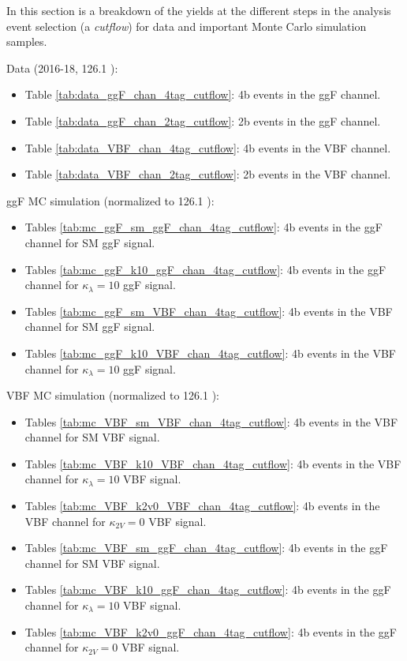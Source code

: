 \label{cutflows-tables}

In this section is a breakdown of the yields at the different steps in the analysis event selection (a \textit{cutflow}) for data and important Monte Carlo simulation samples.

Data (2016-18, 126.1 \ifb):

\begin{itemize}
	\item Table \ref{tab:data_ggF_chan_4tag_cutflow}: 4b events in the ggF channel.
	\item Table \ref{tab:data_ggF_chan_2tag_cutflow}: 2b events in the ggF channel.
	\item Table \ref{tab:data_VBF_chan_4tag_cutflow}: 4b events in the VBF channel.
	\item Table \ref{tab:data_VBF_chan_2tag_cutflow}: 2b events in the VBF channel.
\end{itemize}

ggF \HH MC simulation (normalized to 126.1 \ifb):
\begin{itemize}
	\item Tables \ref{tab:mc_ggF_sm_ggF_chan_4tag_cutflow}: 4b events in the ggF channel for SM ggF \HH signal.
	\item Tables \ref{tab:mc_ggF_k10_ggF_chan_4tag_cutflow}: 4b events in the ggF channel for $\kappa_{\lambda} = 10$ ggF \HH signal.
	\item Tables \ref{tab:mc_ggF_sm_VBF_chan_4tag_cutflow}: 4b events in the VBF channel for SM ggF \HH signal.
	\item Tables \ref{tab:mc_ggF_k10_VBF_chan_4tag_cutflow}: 4b events in the VBF channel for $\kappa_{\lambda} = 10$ ggF \HH signal.
\end{itemize}

VBF \HH MC simulation (normalized to 126.1 \ifb):

\begin{itemize}
	\item Tables \ref{tab:mc_VBF_sm_VBF_chan_4tag_cutflow}: 4b events in the VBF channel for SM VBF \HH signal.
	\item Tables \ref{tab:mc_VBF_k10_VBF_chan_4tag_cutflow}: 4b events in the VBF channel for $\kappa_{\lambda} = 10$ VBF \HH signal.
	\item Tables \ref{tab:mc_VBF_k2v0_VBF_chan_4tag_cutflow}: 4b events in the VBF channel for $\kappa_{2V} = 0$ VBF \HH signal.
	\item Tables \ref{tab:mc_VBF_sm_ggF_chan_4tag_cutflow}: 4b events in the ggF channel for SM VBF \HH signal.
	\item Tables \ref{tab:mc_VBF_k10_ggF_chan_4tag_cutflow}: 4b events in the ggF channel for $\kappa_{\lambda} = 10$ VBF \HH signal.
	\item Tables \ref{tab:mc_VBF_k2v0_ggF_chan_4tag_cutflow}: 4b events in the ggF channel for $\kappa_{2V} = 0$ VBF \HH signal.
\end{itemize}

